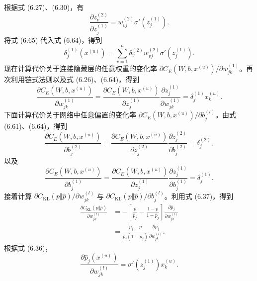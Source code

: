 根据式 (6.27)、(6.30)，有
\begin{equation}
\frac{\partial z_v^{(2)}}{\partial z_j^{(1)}}=w_{vj}^{(2)}\sigma'(z_j^{(1)}).
\tag{6.65}
\end{equation}
将式 (6.65) 代入式 (6.64)，得到
\begin{equation}
\delta_j^{(1)}(x^{(u)})=\sum_{v=1}^n\delta_v^{(2)}w_{vj}^{(2)}\sigma'(z_j^{(1)}).
\tag{6.66}
\end{equation}
现在计算代价关于连接隐藏层的任意权重的变化率 $\partial C_E(W,b,x^{(u)})/\partial w_{jk}^{(1)}$。再次利用链式法则以及式 (6.26)、(6.64)，得到
\begin{equation}
\frac{\partial C_E(W,b,x^{(u)})}{\partial w_{jk}^{(1)}}=
\frac{\partial C_E(W,b,x^{(u)})}{\partial z_j^{(1)}}\frac{\partial z_j^{(1)}}{\partial w_{jk}^{(1)}}=\delta_j^{(1)}x_k^{(u)}.
\tag{6.67}
\end{equation}
下面计算代价关于网络中任意偏置的变化率 $\partial C_E(W,b,x^{(u)})/\partial b_j^{(l)}$。由式 (6.61)、(6.64)，得到
\begin{equation}
\frac{\partial C_E(W,b,x^{(u)})}{\partial b_j^{(2)}}=
\frac{\partial C_E(W,b,x^{(u)})}{\partial z_j^{(2)}}\frac{\partial z_j^{(2)}}{\partial b_j^{(2)}}=\delta_j^{(2)},
\tag{6.68}
\end{equation}
以及
\begin{equation}
\frac{\partial C_E(W,b,x^{(u)})}{\partial b_j^{(1)}}=
\frac{\partial C_E(W,b,x^{(u)})}{\partial z_j^{(1)}}\frac{\partial z_j^{(1)}}{\partial b_j^{(1)}}=\delta_j^{(1)}.
\tag{6.69}
\end{equation}
接着计算 $\partial C_{\mathrm{KL}}(p\Vert\widehat p)/\partial w_{jk}^{(l)}$ 与 $\partial C_{\mathrm{KL}}(p\Vert\widehat p)/\partial b_j^{(l)}$。利用式 (6.37)，得到
\begin{equation}
\begin{aligned}
\frac{\partial C_{\mathrm{KL}}(p\Vert\widehat p)}{\partial w_{jk}^{(l)}}
&=-\left[\frac p{\widehat p_j}-\frac{1-p}{1-\widehat p_j}\right]\frac{\partial\widehat p_j}{\partial w_{jk}^{(l)}}\\
&=\frac{\widehat p_j-p}{\widehat p_j(1-\widehat p_j)}\frac{\partial\widehat p_j}{\partial w_{jk}^{(l)}}.
\end{aligned}\tag{6.70}
\end{equation}
根据式 (6.36)，
\begin{equation}
\frac{\partial\widehat p_j(x^{(u)})}{\partial w_{jk}^{(l)}}=\sigma'(z_j^{(1)})x_k^{(u)}.
\tag{6.71}
\end{equation}

